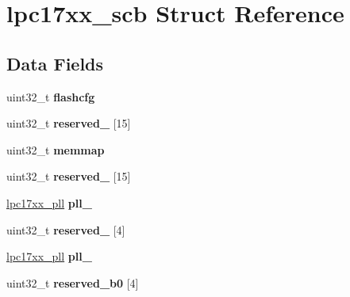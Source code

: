 \hypertarget{structlpc17xx__scb}{}\section{lpc17xx\+\_\+scb Struct Reference}
\label{structlpc17xx__scb}
\subsection*{Data Fields}
\begin{DoxyCompactItemize}
\item 
\mbox{\label{structlpc17xx__scb_a094e4bf7bf09ef58aa66e30c4fd1a3ad}} 
uint32\+\_\+t {\bfseries flashcfg}
\item 
\mbox{\label{structlpc17xx__scb_a3c58c404497c3083cd74f8a9e391ab3a}} 
uint32\+\_\+t {\bfseries reserved\+\_} \mbox{[}15\mbox{]}
\item 
\mbox{\label{structlpc17xx__scb_a2c0e59bcbe8cb87772006a443c1c0edf}} 
uint32\+\_\+t {\bfseries memmap}
\item 
\mbox{\label{structlpc17xx__scb_afc03e155509894550681e4a048d08bf4}} 
uint32\+\_\+t {\bfseries reserved\+\_} \mbox{[}15\mbox{]}
\item 
\mbox{\label{structlpc17xx__scb_a5c817b88c3af91ca9d696a9faa6183d2}} 
\mbox{\hyperlink{structlpc17xx__pll}{lpc17xx\+\_\+pll}} {\bfseries pll\+\_}
\item 
\mbox{\label{structlpc17xx__scb_a5f7f9555ff499df940424e148a2f1bc2}} 
uint32\+\_\+t {\bfseries reserved\+\_} \mbox{[}4\mbox{]}
\item 
\mbox{\label{structlpc17xx__scb_a25a6e965ceb76c81b4fb3e2040beaad3}} 
\mbox{\hyperlink{structlpc17xx__pll}{lpc17xx\+\_\+pll}} {\bfseries pll\+\_}
\item 
\mbox{\label{structlpc17xx__scb_a56759ef99de3b3d95ca7719e7acba1d9}} 
uint32\+\_\+t {\bfseries reserved\+\_\+b0} \mbox{[}4\mbox{]}
\item 
\mbox{\label{structlpc17xx__scb_ac6c13a3dd5e1866ded1b31c3a2b55fa7}} 

\end{DoxyCompactItemize}
